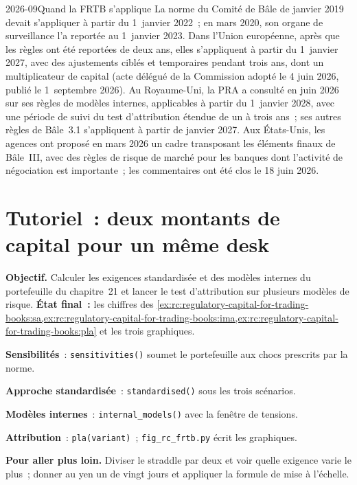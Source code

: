 \begin{dated}{2026-09}{Quand la FRTB s'applique}\label{dat:rc:regulatory-capital-for-trading-books:dates}
La norme du Comité de Bâle de janvier 2019 devait s'appliquer à partir du 1~janvier 2022~; en mars 2020, son
organe de surveillance l'a reportée au 1~janvier 2023. Dans l'Union européenne, après que les règles ont été
reportées de deux ans, elles s'appliquent à partir du 1~janvier 2027, avec des ajustements ciblés et temporaires pendant trois
ans, dont un multiplicateur de capital (acte délégué de la Commission adopté le 4 juin 2026, publié le
1~septembre 2026). Au Royaume-Uni, la PRA a consulté en juin 2026 sur ses règles de modèles internes,
applicables à partir du 1~janvier 2028, avec une période de suivi du test d'attribution étendue de un à trois
ans~; ses autres règles de Bâle~3.1 s'appliquent à partir de janvier 2027. Aux États-Unis, les agences ont proposé
en mars 2026 un cadre transposant les éléments finaux de Bâle~III, avec des règles de risque de marché pour les banques
dont l'activité de négociation est importante~; les commentaires ont été clos le 18 juin 2026.
\end{dated}

\section{Tutoriel~: deux montants de capital pour un même desk}\label{tut:rc:regulatory-capital-for-trading-books:tutorial}

\begin{tutorial}
\textbf{Objectif.} Calculer les exigences standardisée et des modèles internes du portefeuille du chapitre~21 et lancer
le test d'attribution sur plusieurs modèles de risque. \textbf{État final~:} les chiffres des
\cref{ex:rc:regulatory-capital-for-trading-books:sa,ex:rc:regulatory-capital-for-trading-books:ima,ex:rc:regulatory-capital-for-trading-books:pla}
et les trois graphiques.
\begin{tutsteps}
\item \textbf{Sensibilités}~: \texttt{sensitivities()} soumet le portefeuille aux chocs prescrits par la norme.
\item \textbf{Approche standardisée}~: \texttt{standardised()} sous les trois scénarios.
\item \textbf{Modèles internes}~: \texttt{internal\_models()} avec la fenêtre de tensions.
\item \textbf{Attribution}~: \texttt{pla(variant)}~; \texttt{fig\_rc\_frtb.py} écrit les graphiques.
\end{tutsteps}
\textbf{Pour aller plus loin.} Diviser le straddle par deux et voir quelle exigence varie le plus~; donner au
yen un  de vingt jours et appliquer la formule de mise à l'échelle.
\end{tutorial}

